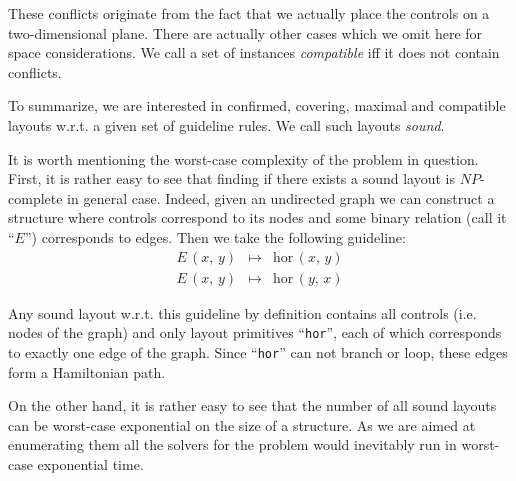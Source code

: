 These conflicts originate from the fact that we actually place the controls on a two-dimensional plane.
There are actually other cases which we omit here for space considerations. We call a set of
instances \emph{compatible} iff it does not contain conflicts.

To summarize, we are interested in confirmed, covering, maximal and compatible layouts w.r.t. a given
set of guideline rules. We call such layouts \emph{sound}.

It is worth mentioning the worst-case complexity of the problem in question. First, it is rather
easy to see that finding if there exists a sound layout is $NP$-complete in general case.
Indeed, given an undirected graph we can construct a structure where controls correspond to its nodes
and some binary relation (call it ``$E$'') corresponds to edges. Then we take the following guideline:
\[
\begin{array}{rcl}
  E\,(x,\, y) & \mapsto & \mbox{hor}\,(x,\, y)\\
  E\,(x,\, y) & \mapsto & \mbox{hor}\,(y,\, x)
\end{array}
\]

Any sound layout w.r.t. this guideline by definition contains all controls (i.e. nodes of the graph) and
only layout primitives ``\texttt{hor}'', each of which corresponds to exactly one edge of the graph. Since
``\texttt{hor}'' can not branch or loop, these edges form a Hamiltonian path.

On the other hand, it is rather easy to see that the number of all sound layouts can be worst-case
exponential on the size of a structure. As we are aimed at enumerating them all the solvers for
the problem would inevitably run in worst-case exponential time.


